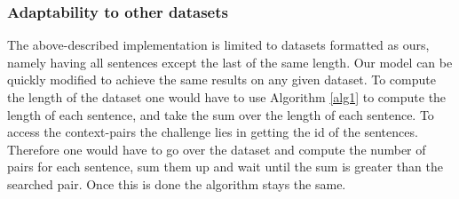 \subsubsection{Adaptability to other datasets}
The above-described implementation is limited to datasets formatted as ours, namely having all sentences except the last of the same length. Our model can be quickly modified to achieve the same results on any given dataset. To compute the length of the dataset one would have to use Algorithm \ref{alg1} to compute the length of each sentence, and take the sum over  the length of each sentence. To access the context-pairs the challenge lies in getting the id of the sentences. Therefore one would have to go over the dataset and compute the number of pairs for each sentence, sum them up and wait until the sum is greater than the searched pair. Once this is done the algorithm stays the same. 


